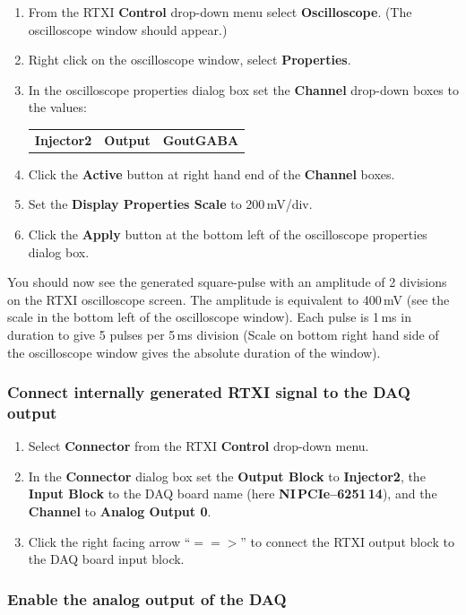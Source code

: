 \documentclass[12pt]{article}
\begin{document}
\begin{enumerate}
	\item From the RTXI {\bf Control} drop-down menu select {\bf Oscilloscope}. (The oscilloscope 
		window should appear.)
	\item Right click on the oscilloscope window, select {\bf Properties}.
	\item In the oscilloscope properties dialog box set the {\bf Channel} drop-down boxes to the values:
		\begin{tabular}{ l c r }
			 {\bf Injector2} & {\bf Output} & {\bf GoutGABA}
		 \end{tabular}
	\item Click the {\bf Active} button at right hand end of the {\bf Channel} boxes.
 	\item Set the {\bf Display Properties Scale} to 200\,mV/div.
 \item Click the {\bf Apply} button at the bottom left of the oscilloscope properties dialog box.

\end{enumerate}
You should now see the generated square-pulse  with an amplitude of 2 divisions on the RTXI oscilloscope screen. The amplitude is equivalent to 400\,mV (see the scale in the bottom left of the oscilloscope window). Each pulse is 1\,ms in duration to give 5 pulses per 5\,ms division (Scale on bottom right hand side of the oscilloscope window gives the absolute duration of the window).

\subsubsection*{Connect internally generated RTXI signal to the DAQ output}

\begin{enumerate}
	\item Select {\bf Connector} from the RTXI {\bf Control} drop-down menu.
	\item In the {\bf Connector} dialog box set the {\bf Output Block} to {\bf Injector2}, the {\bf Input Block} 
		to the DAQ board name (here {\bf NI\,PCIe--6251\,14}), and the {\bf Channel} to {\bf Analog 
		Output 0}.
	\item Click the right facing arrow ``$==>$'' to connect the RTXI output block to the DAQ board input block.
\end{enumerate}

\subsubsection*{Enable the analog output of the DAQ}
\end{document}
